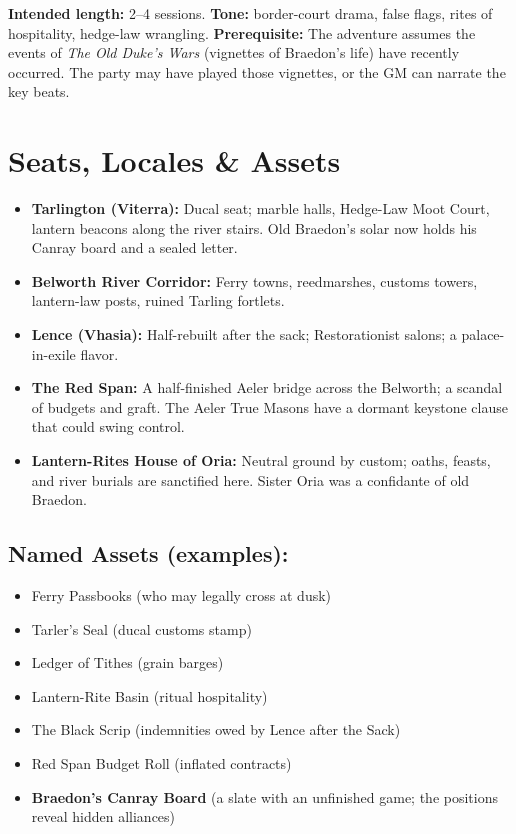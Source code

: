 \documentclass[11pt]{article}
\begin{document}
\textbf{Intended length:} 2--4 sessions. \textbf{Tone:} border-court drama, false flags, rites of hospitality, hedge-law wrangling. \textbf{Prerequisite:} The adventure assumes the events of \textit{The Old Duke's Wars} (vignettes of Braedon's life) have recently occurred. The party may have played those vignettes, or the GM can narrate the key beats.

\section*{Seats, Locales \& Assets}
\begin{itemize}
  \item \textbf{Tarlington (Viterra):} Ducal seat; marble halls, Hedge-Law Moot Court, lantern beacons along the river stairs. Old Braedon's solar now holds his Canray board and a sealed letter.
  \item \textbf{Belworth River Corridor:} Ferry towns, reedmarshes, customs towers, lantern-law posts, ruined Tarling fortlets.
  \item \textbf{Lence (Vhasia):} Half-rebuilt after the sack; Restorationist salons; a palace-in-exile flavor.
  \item \textbf{The Red Span:} A half-finished Aeler bridge across the Belworth; a scandal of budgets and graft. The Aeler True Masons have a dormant keystone clause that could swing control.
  \item \textbf{Lantern-Rites House of Oria:} Neutral ground by custom; oaths, feasts, and river burials are sanctified here. Sister Oria was a confidante of old Braedon.
\end{itemize}

\subsection*{Named Assets (examples):}
\begin{itemize}
  \item Ferry Passbooks (who may legally cross at dusk)
  \item Tarler's Seal (ducal customs stamp)
  \item Ledger of Tithes (grain barges)
  \item Lantern-Rite Basin (ritual hospitality)
  \item The Black Scrip (indemnities owed by Lence after the Sack)
  \item Red Span Budget Roll (inflated contracts)
  \item \textbf{Braedon's Canray Board} (a slate with an unfinished game; the positions reveal hidden alliances)
\end{itemize}
\end{document}
